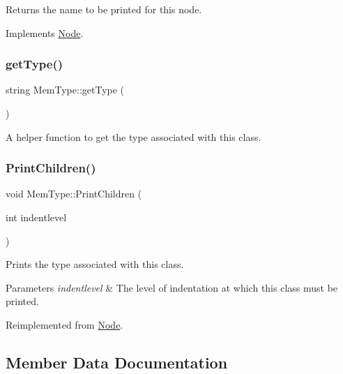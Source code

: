 Returns the name to be printed for this node. 

Implements \hyperlink{class_node_a56e29657306ffb004d69c6929ae44269}{Node}.

\mbox{\label{class_mem_type_aa7003b89f89d3faa43e6eeaa3116d544}} 
\subsubsection{\texorpdfstring{get\+Type()}{getType()}}
{\footnotesize\ttfamily string Mem\+Type\+::get\+Type (\begin{DoxyParamCaption}{ }\end{DoxyParamCaption})\hspace{0.3cm}{\ttfamily [inline]}}

A helper function to get the type associated with this class. \mbox{\label{class_mem_type_a98f3fd7954d2edaaa2f809cb2889e420}} 
\subsubsection{\texorpdfstring{Print\+Children()}{PrintChildren()}}
{\footnotesize\ttfamily void Mem\+Type\+::\+Print\+Children (\begin{DoxyParamCaption}\item[{int}]{indentlevel }\end{DoxyParamCaption})\hspace{0.3cm}{\ttfamily [virtual]}}

Prints the type associated with this class. 
\begin{DoxyParams}{Parameters}
{\em indentlevel} & The level of indentation at which this class must be printed. \\
\hline
\end{DoxyParams}


Reimplemented from \hyperlink{class_node_a3e67ec8d22182b721717af14fe0c3000}{Node}.



\subsection{Member Data Documentation}
\mbox{\label{class_mem_type_abf81810db8d14176f971fb6d6c5f510d}} 
